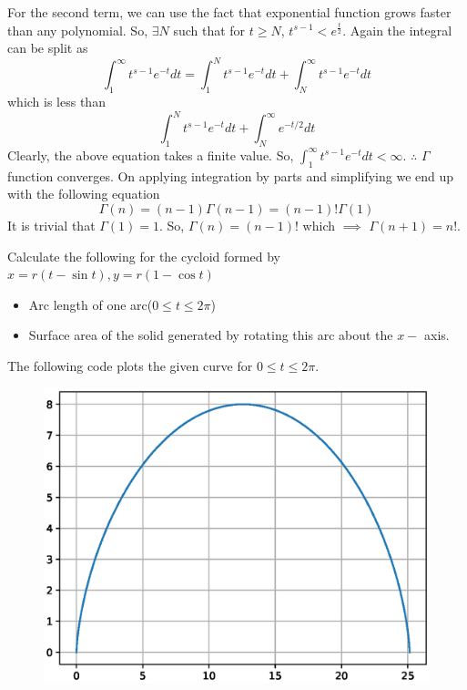 \documentclass[journal,12pt,twocolumn]{IEEEtran}
\begin{document}
For the second term, we can use the fact that exponential function grows faster than any polynomial. So, $\exists N$ such that for $t\ge N$, $t^{s-1}<e^{\frac{t}{2}}$. Again the integral can be split as 
\begin{equation}
\int_{1}^{\infty}t^{s-1} e^{-t} dt = \int_{1}^{N}t^{s-1} e^{-t} dt + \int_{N}^{\infty}t^{s-1} e^{-t} dt 
\end{equation}
which is less than 
\begin{equation}
\int_{1}^{N}t^{s-1} e^{-t} dt + \int_{N}^{\infty} e^{-t/2} dt
\end{equation}
Clearly, the above equation takes a finite value. So, $\int_{1}^{\infty}t^{s-1} e^{-t} dt<\infty$. $\therefore$ $\Gamma$ function converges.
On applying integration by parts and simplifying we end up with the following equation
\begin{equation}
\Gamma(n)=(n-1)\Gamma(n-1)=(n-1)!\Gamma(1)
\end{equation}
It is trivial that $\Gamma(1)=1$. So, $\Gamma(n)=(n-1)!$ which $\implies$ $\Gamma(n+1)=n!$. 
\begin{problem}
Calculate the following for the cycloid formed by $x=r(t-\sin t),y=r(1-\cos t)$
\begin{itemize}
\item Arc length of one arc($0 \le t \le 2\pi$)
\item Surface area of the solid generated by rotating this arc about the $x-$ axis. 
\end{itemize}
\end{problem}      
\solution
The following code plots the given curve for $0 \le t \le 2\pi$.

\begin{figure}[!ht]
\begin{center}
\includegraphics[width=\columnwidth]{./figs/8.eps}
\end{center}
\label{fig:4}	
\end{figure}
\end{document}
